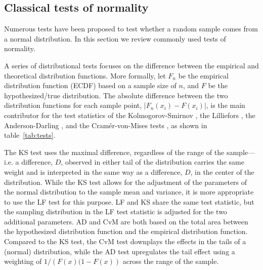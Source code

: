 \documentclass{article}\usepackage[]{graphicx}\usepackage[]{color}
\newcommand{\alnote}[1]{\todo[inline,color=green!40]{#1}}
\begin{document}

\subsection{Classical tests of normality}
Numerous tests have been proposed to test whether a random sample comes from a normal distribution. In this section we review commonly used tests of normality. 

A series of distributional tests focuses on the difference between the empirical and theoretical distribution functions. More formally, let $F_n$ be the empirical distribution function (ECDF) based on a sample size of $n$, and $F$ be the hypothesized/true distribution. The absolute difference between the two distribution functions for each sample point, $\left| F_n(x_i) - F(x_i) \right|$, is the main contributor for the test statistics of the Kolmogorov-Smirnov \cite[KS-test,][]{kolmogorov:1933, smirnov:1948}, the Lilliefors \cite[LF-test, ][]{lilliefors}, the Anderson-Darling \citep[AD-test,][]{adtest:1954}, and the Cram\'{e}r-von-Mises tests \citep[CvM-test,][]{cramer:1928, mises:1928}, as shown in table~\ref{tab:tests}.

The KS test uses the maximal  difference, 
regardless of the range of the sample---i.e. a difference, $D$, observed in either tail of the distribution carries the same weight and is interpreted in the same way as a difference, $D$, in the center of the distribution. While the KS test allows for the adjustment of the parameters of the normal distribution to the sample mean and variance, it is more appropriate to use the LF test for this purpose. LF and KS share the same test statistic, but the sampling distribution in the LF test statistic is adjusted for the two additional parameters.  AD and CvM  are both based on the total area between the hypothesized distribution function and the empirical distribution function. Compared to the KS  test,  the CvM test downplays the effects in the tails of a (normal) distribution, while the AD test upregulates the tail effect using a weighting of $1/\left(F(x)(1 - F(x)\right)$ across the range of the sample. 
\end{document}
